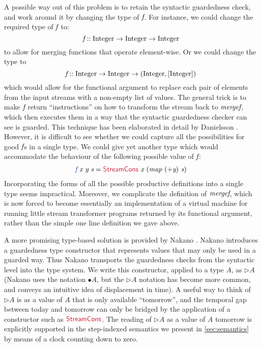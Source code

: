 A possible way out of this problem is to retain the syntactic
guardedness check, and work around it by changing the type of
$\textit{f}$. For instance, we could change the required type of
$\textit{f}$ to:
\begin{displaymath}
  \textit{f} :: \textrm{Integer} \to \textrm{Integer} \to \textrm{Integer}
\end{displaymath}
to allow for merging functions that operate element-wise. Or we could
change the type to
\begin{displaymath}
  \textit{f} :: \textrm{Integer} \to \textrm{Integer} \to (\textrm{Integer}, [\textrm{Integer}])
\end{displaymath}
which would allow for the functional argument to replace each pair of
elements from the input streams with a non-empty list of values. The
general trick is to make $\textit{f}$ return ``instructions'' on how to
transform the stream back to $\textit{mergef}$, which then executes
them in a way that the syntactic guardedness checker can see is
guarded. This technique has been elaborated in detail by Danielsson
\cite{danielsson10beating}. However, it is difficult to see whether we
could capture all the possibilities for good $\textit{f}$s in a single
type. We could give yet another type which would accommodate the
behaviour of the following possible value of $\textit{f}$:
\begin{displaymath}
  \begin{array}{l}
    \defn{f}\ \ident{x}\ \ident{y}\ \ident{s} = \cons{StreamCons}\ \ident{x}\ (\ident{map}\ (+\ident{y})\ \ident{s})
  \end{array}
\end{displaymath}
Incorporating the forms of all the possible productive definitions
into a single type seems impractical. Moreover, we complicate the
definition of $\textit{mergef}$, which is now forced to become
essentially an implementation of a virtual machine for running little
stream transformer programs returned by its functional argument,
rather than the simple one line definition we gave above.

A more promising type-based solution is provided by Nakano
\cite{nakano00modality}. Nakano introduces a guardedness type
constructor that represents values that may only be used in a guarded
way. Thus Nakano transports the guardedness checks from the syntactic
level into the type system. We write this constructor, applied to a
type $A$, as $\rhd A$ (Nakano uses the notation $\bullet A$, but the
$\rhd A$ notation has become more common, and conveys an intuitive
idea of displacement in time). A useful way to think of $\rhd A$ is as a
value of $A$ that is only available ``tomorrow'', and the temporal gap
between today and tomorrow can only be bridged by the application of a
constructor such as $\cons{StreamCons}$. The reading of $\rhd A$ as a
value of $A$ tomorrow is explicitly supported in the step-indexed
semantics we present in \autoref{sec:semantics} by means of a clock
counting down to zero.

